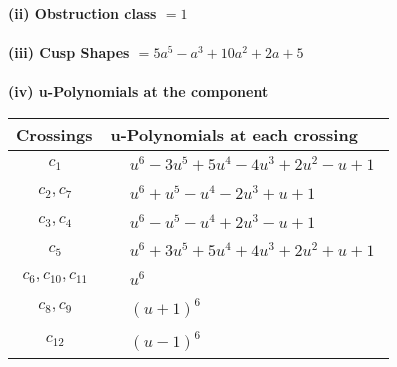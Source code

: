 \documentclass[1p]{elsarticle_modified}
\theoremstyle{definition}
\begin{document}
\flushleft \textbf{(ii) Obstruction class $= 1$}\\~\\
\flushleft \textbf{(iii) Cusp Shapes $= 5 a^5- a^3+10 a^2+2 a+5$}\\~\\
\newpage\renewcommand{\arraystretch}{1}
\flushleft \textbf{(iv) u-Polynomials at the component}\newline \\
\begin{tabular}{m{50pt}|m{274pt}}
Crossings & \hspace{64pt}u-Polynomials at each crossing \\
\hline $$\begin{aligned}c_{1}\end{aligned}$$&$\begin{aligned}
&u^6-3 u^5+5 u^4-4 u^3+2 u^2- u+1
\end{aligned}$\\
\hline $$\begin{aligned}c_{2},c_{7}\end{aligned}$$&$\begin{aligned}
&u^6+u^5- u^4-2 u^3+u+1
\end{aligned}$\\
\hline $$\begin{aligned}c_{3},c_{4}\end{aligned}$$&$\begin{aligned}
&u^6- u^5- u^4+2 u^3- u+1
\end{aligned}$\\
\hline $$\begin{aligned}c_{5}\end{aligned}$$&$\begin{aligned}
&u^6+3 u^5+5 u^4+4 u^3+2 u^2+u+1
\end{aligned}$\\
\hline $$\begin{aligned}c_{6},c_{10},c_{11}\end{aligned}$$&$\begin{aligned}
&u^6
\end{aligned}$\\
\hline $$\begin{aligned}c_{8},c_{9}\end{aligned}$$&$\begin{aligned}
&(u+1)^6
\end{aligned}$\\
\hline $$\begin{aligned}c_{12}\end{aligned}$$&$\begin{aligned}
&(u-1)^6
\end{aligned}$\\
\hline
\end{tabular}\\~\\
\end{document}
